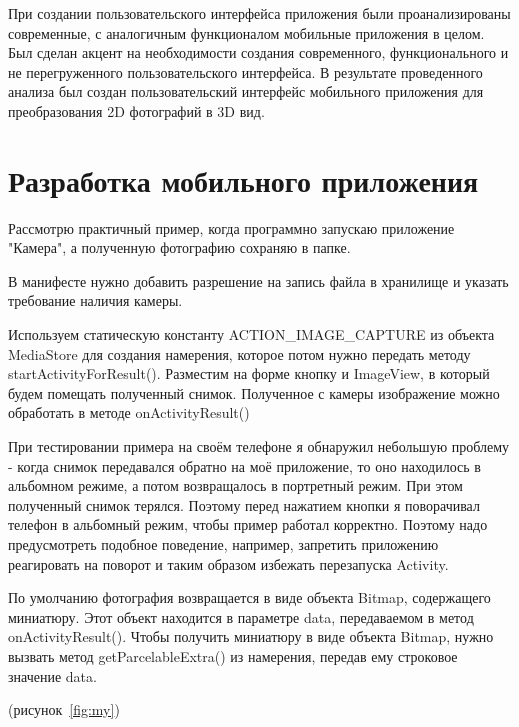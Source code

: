 При создании пользовательского интерфейса приложения были проанализированы современные, с аналогичным функционалом мобильные приложения в целом. Был сделан акцент на необходимости создания современного, функционального и не перегруженного пользовательского интерфейса. В результате проведенного анализа был создан пользовательский интерфейс мобильного приложения для преобразования 2D фотографий в 3D вид.

\section{Разработка мобильного приложения}

Рассмотрю практичный пример, когда программно запускаю приложение "Камера", а полученную фотографию сохраняю в папке.~\cite{camera}

В манифесте нужно добавить разрешение на запись файла в хранилище и указать требование наличия камеры.

Используем статическую константу ACTION\_IMAGE\_CAPTURE из объекта MediaStore для создания намерения, которое потом нужно передать методу startActivityForResult(). Разместим на форме кнопку и ImageView, в который будем помещать полученный снимок. Полученное с камеры изображение можно обработать в методе onActivityResult()

При тестировании примера на своём телефоне я обнаружил небольшую проблему - когда снимок передавался обратно на моё приложение, то оно находилось в альбомном режиме, а потом возвращалось в портретный режим. При этом полученный снимок терялся. Поэтому перед нажатием кнопки я поворачивал телефон в альбомный режим, чтобы пример работал корректно. Поэтому надо предусмотреть подобное поведение, например, запретить приложению реагировать на поворот и таким образом избежать перезапуска Activity. 

По умолчанию фотография возвращается в виде объекта Bitmap, содержащего миниатюру. Этот объект находится в параметре data, передаваемом в метод onActivityResult(). Чтобы получить миниатюру в виде объекта Bitmap, нужно вызвать метод getParcelableExtra() из намерения, передав ему строковое значение data.

(рисунок~\ref{fig:my})

